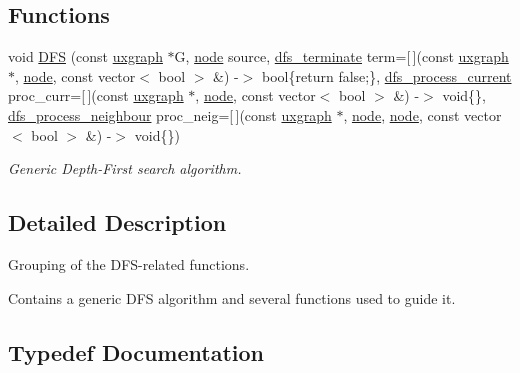 \subsection*{Functions}
\begin{DoxyCompactItemize}
\item 
void \hyperlink{namespacelgraph_1_1traversal_1_1dfs_a94225efb9081d9240d716d96b3e99a2f}{D\+FS} (const \hyperlink{classlgraph_1_1utils_1_1uxgraph}{uxgraph} $\ast$G, \hyperlink{namespacelgraph_1_1utils_ab9c6b34241f0b68372c55f34c460e863}{node} source, \hyperlink{namespacelgraph_1_1traversal_1_1dfs_a41b39b9a31fd3665c970a6eb70564765}{dfs\+\_\+terminate} term=\mbox{[}$\,$\mbox{]}(const \hyperlink{classlgraph_1_1utils_1_1uxgraph}{uxgraph} $\ast$, \hyperlink{namespacelgraph_1_1utils_ab9c6b34241f0b68372c55f34c460e863}{node}, const vector$<$ bool $>$ \&) -\/$>$ bool\{return false;\}, \hyperlink{namespacelgraph_1_1traversal_1_1dfs_a918161e9face694d4ebdc4ba13cdd5ac}{dfs\+\_\+process\+\_\+current} proc\+\_\+curr=\mbox{[}$\,$\mbox{]}(const \hyperlink{classlgraph_1_1utils_1_1uxgraph}{uxgraph} $\ast$, \hyperlink{namespacelgraph_1_1utils_ab9c6b34241f0b68372c55f34c460e863}{node}, const vector$<$ bool $>$ \&) -\/$>$ void\{\}, \hyperlink{namespacelgraph_1_1traversal_1_1dfs_af04d72933b75432a505b1235d173da4b}{dfs\+\_\+process\+\_\+neighbour} proc\+\_\+neig=\mbox{[}$\,$\mbox{]}(const \hyperlink{classlgraph_1_1utils_1_1uxgraph}{uxgraph} $\ast$, \hyperlink{namespacelgraph_1_1utils_ab9c6b34241f0b68372c55f34c460e863}{node}, \hyperlink{namespacelgraph_1_1utils_ab9c6b34241f0b68372c55f34c460e863}{node}, const vector$<$ bool $>$ \&) -\/$>$ void\{\})
\begin{DoxyCompactList}\small\item\em Generic Depth-\/\+First search algorithm. \end{DoxyCompactList}\end{DoxyCompactItemize}


\subsection{Detailed Description}
Grouping of the D\+F\+S-\/related functions. 

Contains a generic D\+FS algorithm and several functions used to guide it. 

\subsection{Typedef Documentation}
